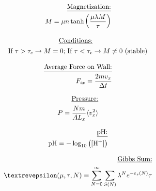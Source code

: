 \documentclass[12pt]{article}
\begin{document}
\begin{multicols}{2}

  \begin{equation*}
    \begin{split}
      \text{\underline{Magnetization:}}\\
      M=\mu n\tanh\left( \frac{\mu\lambda M}{\tau} \right)
    \end{split}
  \end{equation*}

  \begin{equation*}
    \begin{split}
      \text{\underline{Conditions:}}&\\
      \text{If }\tau>\tau_c\to M=0;\,\text{If }\tau<\tau_c&\to M\neq 0 \text{ (stable)}
    \end{split}
  \end{equation*}

\end{multicols}

\vspace{-35pt}

\begin{multicols}{2}

  \begin{equation*}
    \begin{split}
      \text{\underline{Average Force on Wall:}}\\
      F_{ix}= \frac{2mv_x}{\Delta t}
    \end{split}
  \end{equation*}

  \begin{equation*}
    \begin{split}
      \text{\underline{Pressure:}}\\
      P=\frac{Nm}{AL_x}\langle v_x^2\rangle
    \end{split}
  \end{equation*}

\end{multicols}

\vspace{-35pt}

\begin{multicols}{2}

  \begin{equation*}
    \begin{split}
      \text{\underline{pH:}}\\
      \ce{pH}=-\log_{10}\left( [\ce{H^+}] \right)
    \end{split}
  \end{equation*}

  \begin{equation*}
    \begin{split}
      \text{\underline{Gibbs Sum:}}\\
      \text{\textrevepsilon}(\mu,\tau,N)=\sum_{N=0}^\infty\sum_{S(N)}\lambda^Ne^{-\varepsilon_s(N)}{\tau}
    \end{split}
  \end{equation*}

\end{multicols}
\end{document}
